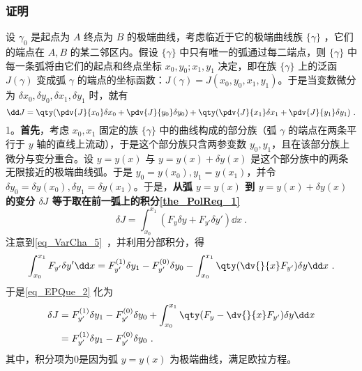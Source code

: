 \subsubsection{证明}
设 $\gamma_0$ 是起点为 $A$ 终点为 $B$ 的极端曲线，考虑临近于它的极端曲线族 $\{\gamma\}$ ，它们的端点在 $A,B$ 的某二邻区内。假设 $\{\gamma\}$ 中只有唯一的弧通过每二端点，则 $\{\gamma\}$ 中每一条弧将由它们的起点和终点坐标 $x_0,y_0;x_1,y_1$ 决定，即在族 $\{\gamma\}$ 上的泛函 $J(\gamma)$ 变成弧 $\gamma$ 的端点的坐标函数：$J(\gamma)=J(x_0,y_0,x_1,y_1)$。于是当变数微分为 $\delta x_0,\delta y_0,\delta x_1,\delta y_1$ 时，就有
\begin{equation}
\dd J=\qty(\pdv{J}{x_0}\delta x_0+\pdv{J}{y_0}\delta y_0)+\qty(\pdv{J}{x_1}\delta x_1+\pdv{J}{y_1}\delta y_1)~.
\end{equation}
1。\textbf{首先}，考虑 $x_0,x_1$ 固定的族 $\{\gamma\}$ 中的曲线构成的部分族（弧 $\gamma$ 的端点在两条平行于 $y$ 轴的直线上流动），于是这个部分族只含两参变数 $y_0,y_1$，且在该部分族上微分与变分重合。设 $y=y(x)$ 与 $y=y(x)+\delta y(x)$ 是这个部分族中的两条无限接近的极端曲线弧。于是 $y_0=y(x_0),y_1=y(x_1)$，并令 $\delta y_0=\delta y(x_0),\delta y_1=\delta y(x_1)$。于是，\textbf{从弧 $y=y(x)$ 到 $y=y(x)+\delta y(x)$ 的变分 $\delta J$ 等于取在前一弧上的积分\autoref{the_PolReq_1}~}
\begin{equation}\label{eq_EPQue_2}
\delta J=\int_{x_0}^{x_1}(F_{y}\delta y+F_{y'}\delta y')\dd x~.
\end{equation}
注意到\autoref{eq_VarCha_5}~，并利用分部积分，得
\begin{equation}
\int_{x_0}^{x_1}F_{y'}\delta y' \dd x=F_{y'}^{(1)}\delta y_1-F_{y'}^{(0)}\delta y_0-\int_{x_0}^{x_1}\qty(\dv{}{x}F_{y'})\delta y\dd x~.
\end{equation}
于是\autoref{eq_EPQue_2} 化为
\begin{equation}
\begin{aligned}
\delta J&=F_{y'}^{(1)}\delta y_1-F_{y'}^{(0)}\delta y_0+\int_{x_0}^{x_1}\qty(F_y-\dv{}{x}F_{y'})\delta y\dd x\\
&=F_{y'}^{(1)}\delta y_1-F_{y'}^{(0)}\delta y_0~.
\end{aligned}
\end{equation}
其中，积分项为0是因为弧 $y=y(x)$ 为极端曲线，满足欧拉方程。

